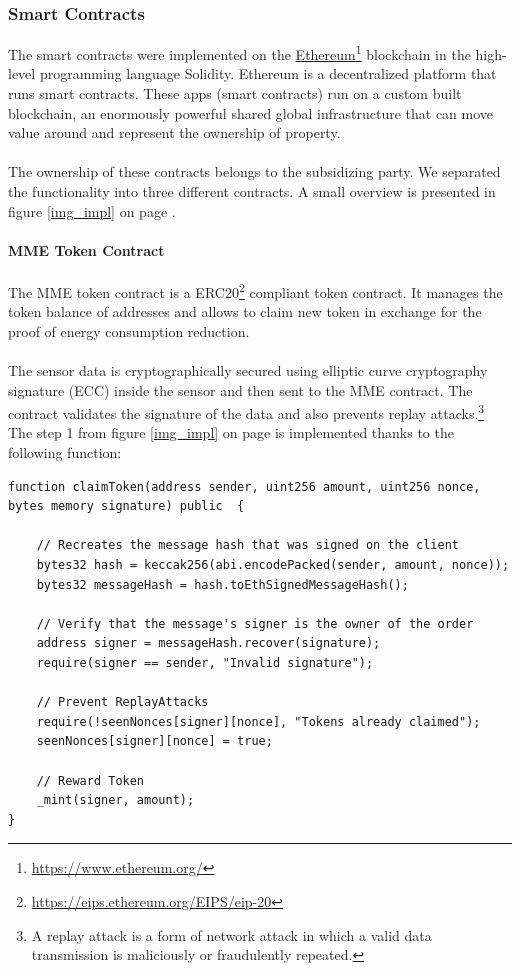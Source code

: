 \documentclass[11pt]{article}
\begin{document}
\subsubsection{Smart Contracts}
The smart contracts were implemented on the \hyperref[https://www.ethereum.org/]{Ethereum}\footnote{\href{https://www.ethereum.org/}{https://www.ethereum.org/}} blockchain in the high-level programming language Solidity. Ethereum is a decentralized platform that runs smart contracts. These apps (smart contracts) run on a custom built blockchain, an enormously powerful shared global infrastructure that can move value around and represent the ownership of property.\cite{23}\\\\
The ownership of these contracts belongs to the subsidizing party.
We separated the functionality into three different contracts. A small overview is presented in figure \ref{img_impl} on page \pageref{img_impl}.


\paragraph{MME Token Contract}
The MME token contract is a ERC20\footnote{\href{https://eips.ethereum.org/EIPS/eip-20}{https://eips.ethereum.org/EIPS/eip-20}} compliant token contract. It manages the token balance of addresses and allows to claim new token in exchange for the proof of energy consumption reduction. \\\\
The sensor data is cryptographically secured using elliptic curve cryptography signature (ECC) \cite{24} inside the sensor and then sent to the MME contract. The contract validates the signature of the data and also prevents replay attacks.\footnote{A replay attack is a form of network attack in which a valid data transmission is maliciously or fraudulently repeated.}\\

The step 1 from figure \ref{img_impl} on page \pageref{img_impl} is implemented thanks to the following function:
\begin{lstlisting}[language=Solidity, firstnumber=28,caption={src/smartcontracts/contracts/MMEToken.sol},captionpos=b]
function claimToken(address sender, uint256 amount, uint256 nonce, bytes memory signature) public  {

	// Recreates the message hash that was signed on the client
	bytes32 hash = keccak256(abi.encodePacked(sender, amount, nonce));
	bytes32 messageHash = hash.toEthSignedMessageHash();

	// Verify that the message's signer is the owner of the order
	address signer = messageHash.recover(signature);
	require(signer == sender, "Invalid signature");

	// Prevent ReplayAttacks
	require(!seenNonces[signer][nonce], "Tokens already claimed");
	seenNonces[signer][nonce] = true;

	// Reward Token
	_mint(signer, amount);
}
\end{lstlisting}
\end{document}
